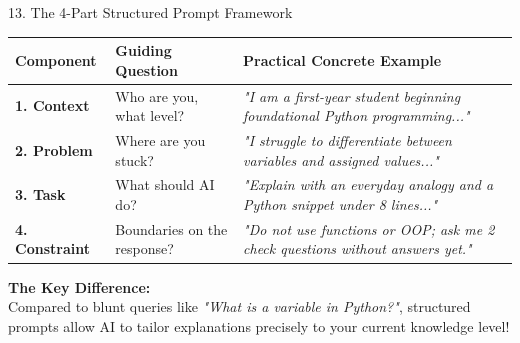 \documentclass[aspectratio=169, 10pt]{beamer}
\begin{document}
\begin{frame}{13. The 4-Part Structured Prompt Framework}
  \scriptsize
  \begin{tabularx}{\textwidth}{l p{3.2cm} X}
    \toprule
    \textbf{Component} & \textbf{Guiding Question} & \textbf{Practical Concrete Example} \\
    \midrule
    \textbf{1. Context} & Who are you, what level? & \textit{"I am a first-year student beginning foundational Python programming..."} \\
    \textbf{2. Problem} & Where are you stuck? & \textit{"I struggle to differentiate between variables and assigned values..."} \\
    \textbf{3. Task} & What should AI do? & \textit{"Explain with an everyday analogy and a Python snippet under 8 lines..."} \\
    \textbf{4. Constraint} & Boundaries on the response? & \textit{"Do not use functions or OOP; ask me 2 check questions without answers yet."} \\
    \bottomrule
  \end{tabularx}
  \vspace{0.15cm}
  \begin{tcolorbox}[colback=secondarygreen!8, colframe=secondarygreen, arc=3pt, left=8pt, right=8pt, top=3pt, bottom=3pt]
    \textbf{\footnotesize The Key Difference:}\\
    \footnotesize Compared to blunt queries like \textit{"What is a variable in Python?"}, structured prompts allow AI to tailor explanations precisely to your current knowledge level!
  \end{tcolorbox}
\end{frame}
\end{document}
